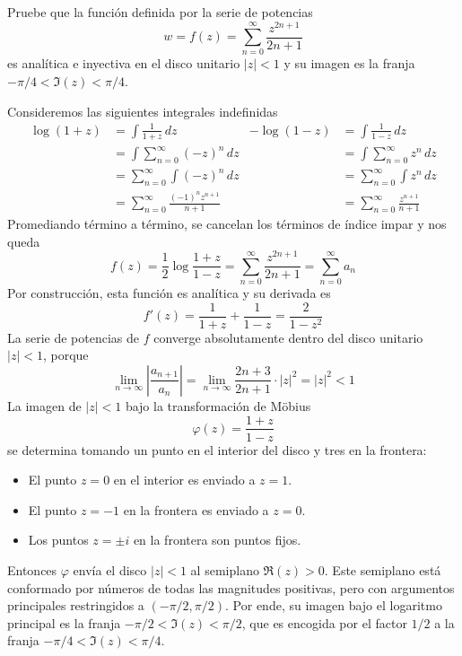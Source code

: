 \begin{exercise}
Pruebe que la función definida por la serie de potencias
$$w = f(z) = \sum_{n=0}^\infty \frac {z^{2n+1}} {2n+1}$$
es analítica e inyectiva en el disco unitario $|z| < 1$ y su imagen es la franja $-\pi/4 < \Im(z) < \pi/4$.
\end{exercise}

\begin{solution}
Consideremos las siguientes integrales indefinidas
\begin{align*}
\log (1+z)
    &= \int \frac 1 {1+z} \, dz &
-\log (1-z)
    &= \int \frac 1 {1-z} \, dz \\
    &= \int \sum_{n=0}^\infty (-z)^n \, dz &
    &= \int \sum_{n=0}^\infty z^n \, dz \\
    &= \sum_{n=0}^\infty \int (-z)^n \, dz &
    &= \sum_{n=0}^\infty \int z^n \, dz \\
    &= \sum_{n=0}^\infty \frac {(-1)^n z^{n+1}} {n+1} &
    &= \sum_{n=0}^\infty \frac {z^{n+1}} {n+1}
\end{align*}
Promediando término a término, se cancelan los términos de índice impar y nos queda
$$f(z) = \frac 12 \log \frac {1+z} {1-z} = \sum_{n=0}^\infty \frac {z^{2n+1}} {2n+1} = \sum_{n=0}^\infty a_n$$
Por construcción, esta función es analítica y su derivada es
$$f'(z) = \frac 1 {1+z} + \frac 1 {1-z} = \frac 2 {1 - z^2}$$
La serie de potencias de $f$ converge absolutamente dentro del disco unitario $|z| < 1$, porque
$$
\lim_{n \to \infty} \left| \frac {a_{n+1}} {a_n} \right|
    = \lim_{n \to \infty} \frac {2n+3} {2n+1} \cdot |z|^2
    = |z|^2
    < 1
$$
La imagen de $|z| < 1$ bajo la transformación de Möbius
$$\varphi(z) = \frac {1+z} {1-z}$$
se determina tomando un punto en el interior del disco y tres en la frontera:
\begin{itemize}
    \item El punto $z = 0$ en el interior es enviado a $z = 1$.
    \item El punto $z = -1$ en la frontera es enviado a $z = 0$.
    \item Los puntos $z = \pm i$ en la frontera son puntos fijos.
\end{itemize}
Entonces $\varphi$ envía el disco $|z| < 1$ al semiplano $\Re(z) > 0$. Este semiplano está conformado por números de todas las magnitudes positivas, pero con argumentos principales restringidos a $(-\pi/2, \pi/2)$. Por ende, su imagen bajo el logaritmo principal es la franja $-\pi/2 < \Im(z) < \pi/2$, que es encogida por el factor $1/2$ a la franja $-\pi/4 < \Im(z) < \pi/4$.
\end{solution}
